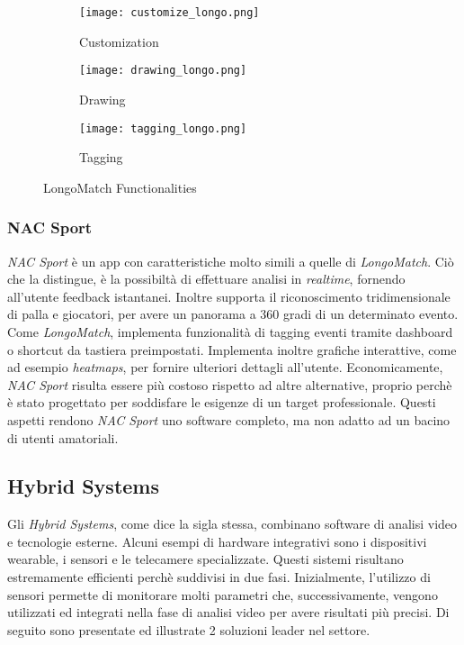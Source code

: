 \begin{figure}[htb]
    \centering 
\begin{subfigure}{0.33\textwidth}
\texttt{[image: customize\_longo.png]}
\caption{Customization}
\label{fig:customization_longo}
\end{subfigure}\hfil
\begin{subfigure}{0.33\textwidth}
\texttt{[image: drawing\_longo.png]}
\caption{Drawing}
\label{fig:drawing_longo}
\end{subfigure}\hfil 
\begin{subfigure}{0.33\textwidth}
\texttt{[image: tagging\_longo.png]}
\caption{Tagging}
\label{fig:tagging_longo}
\end{subfigure}\hfil 
\caption{
\label{fig:analysis_competitor}LongoMatch Functionalities}
\end{figure}

\subsubsection{NAC Sport}
\textit{NAC Sport} \cite{NacSport} è un app con caratteristiche molto simili a quelle di \textit{LongoMatch}. Ciò che la distingue, è la possibiltà di effettuare analisi in \textit{realtime}, fornendo all'utente feedback istantanei. Inoltre supporta il riconoscimento tridimensionale di palla e giocatori, per avere un panorama a 360 gradi di un determinato evento. Come \textit{LongoMatch}, implementa funzionalità di tagging eventi tramite dashboard o shortcut da tastiera preimpostati. Implementa inoltre grafiche interattive, come ad esempio \textit{heatmaps}, per fornire ulteriori dettagli all'utente. Economicamente, \textit{NAC Sport} risulta essere più costoso rispetto ad altre alternative, proprio perchè è stato progettato per soddisfare le esigenze di un target professionale. Questi aspetti rendono \textit{NAC Sport} uno software completo, ma non adatto ad un bacino di utenti amatoriali.

\pagebreak

\subsection{Hybrid Systems}
Gli \textit{Hybrid Systems}, come dice la sigla stessa, combinano software di analisi video e tecnologie esterne. Alcuni esempi di hardware integrativi sono i dispositivi wearable, i sensori e le telecamere specializzate. Questi sistemi risultano estremamente efficienti perchè suddivisi in due fasi. Inizialmente, l'utilizzo di sensori permette di monitorare molti parametri che, successivamente, vengono utilizzati ed integrati nella fase di analisi video per avere risultati più precisi. 
\noindent Di seguito sono presentate ed illustrate 2 soluzioni leader nel settore.

